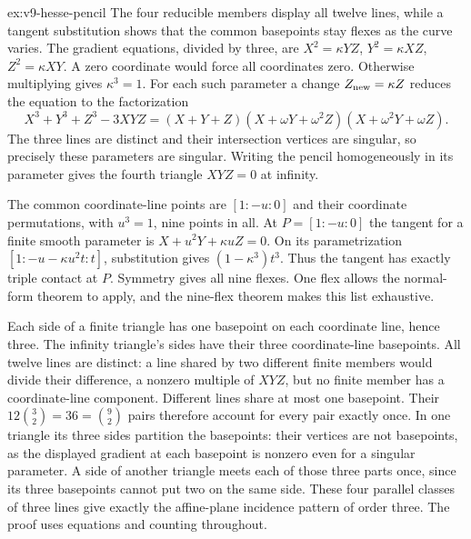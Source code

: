 \begin{solution}{ex:v9-hesse-pencil}
\idea The four reducible members display all twelve lines, while a tangent substitution shows that the common basepoints stay flexes as the curve varies.
\writeup The gradient equations, divided by three, are $X^2=\kappa YZ$, $Y^2=\kappa XZ$, $Z^2=\kappa XY$. A zero coordinate would force all coordinates zero. Otherwise multiplying gives $\kappa^3=1$. For each such parameter a change $Z_{\rm new}=\kappa Z$ reduces the equation to the factorization
\[
X^3+Y^3+Z^3-3XYZ
=(X+Y+Z)(X+\omega Y+\omega^2Z)(X+\omega^2Y+\omega Z).
\]
The three lines are distinct and their intersection vertices are singular, so precisely these parameters are singular. Writing the pencil homogeneously in its parameter gives the fourth triangle $XYZ=0$ at infinity.

The common coordinate-line points are $[1:-u:0]$ and their coordinate permutations, with $u^3=1$, nine points in all. At $P=[1:-u:0]$ the tangent for a finite smooth parameter is $X+u^2Y+\kappa uZ=0$. On its parametrization $[1:-u-\kappa u^2t:t]$, substitution gives $(1-\kappa^3)t^3$. Thus the tangent has exactly triple contact at $P$. Symmetry gives all nine flexes. One flex allows the normal-form theorem to apply, and the nine-flex theorem makes this list exhaustive.

Each side of a finite triangle has one basepoint on each coordinate line, hence three. The infinity triangle's sides have their three coordinate-line basepoints. All twelve lines are distinct: a line shared by two different finite members would divide their difference, a nonzero multiple of $XYZ$, but no finite member has a coordinate-line component. Different lines share at most one basepoint. Their $12\binom32=36=\binom92$ pairs therefore account for every pair exactly once. In one triangle its three sides partition the basepoints: their vertices are not basepoints, as the displayed gradient at each basepoint is nonzero even for a singular parameter. A side of another triangle meets each of those three parts once, since its three basepoints cannot put two on the same side. These four parallel classes of three lines give exactly the affine-plane incidence pattern of order three. The proof uses equations and counting throughout.
\end{solution}
